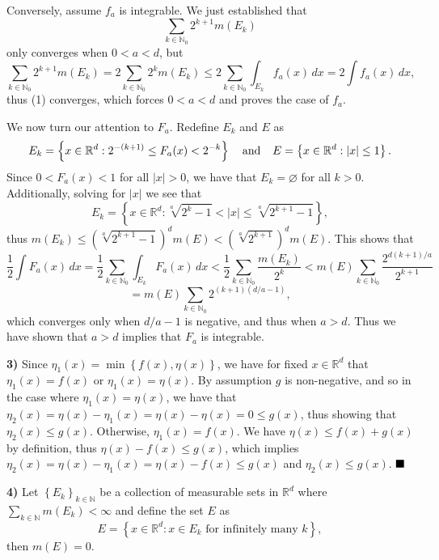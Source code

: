 \documentclass[12pt]{article}
\newcommand{\N}{\ensuremath{\mathbb{N}}}
\newcommand{\R}{\ensuremath{\mathbb{R}}}
\newcommand{\braceb}[1]{\left\{#1\right\}}
\newcommand{\vertb}[1]{\left\vert#1\right\vert}
\newcommand{\done}{\ensuremath{\strut\hfill\blacksquare}}
\renewcommand{\t}[1]{\text{ #1 }}
\newcommand{\sectionskip}{\vspace{0.15in}}
\begin{document}
Conversely, assume \( f_a \) is integrable.
We just established that
\begin{equation}
	\sum_{k \in \N_0} 2^{k + 1}m(E_k)
\end{equation}
only converges when \( 0 < a < d \), but
\[
	\sum_{k \in \N_0} 2^{k + 1}m(E_k)
	= 2\sum_{k \in \N_0} 2^{k}m(E_k)
	\leq 2\sum_{k \in \N_0} \int_{E_k} f_a(x) \, dx
	= 2\int f_a(x) \, dx,
\]
thus (1) converges, which forces \( 0 < a < d \) and proves the case of
\( f_a \).

We now turn our attention to \( F_a \).
Redefine \( E_k \) and \( E \) as
\[
	E_k = \braceb{x \in \R^d : 2^{-(k + 1)} \leq F_a(x) < 2^{-k}}
	\hspace{0.1in}
	\t{and}
	\hspace{0.1in}
	E = \braceb{x \in \R^d : \vertb{x} \leq 1}.
\]
Since \( 0 < F_a(x) < 1 \) for all \( \vertb{x} > 0 \), we have that
\( E_k = \varnothing \) for all \( k > 0 \).
Additionally, solving for \( \vertb{x} \) we see that
\[
	E_k = \braceb{
		x \in \R^d
		: \sqrt[a]{2^k - 1}
		< \vertb{x}
		\leq \sqrt[a]{2^{k + 1} - 1}
	},
\]
thus
\(
m(E_k)
\leq (\sqrt[a]{2^{k + 1} - 1})^dm(E)
< (\sqrt[a]{2^{k + 1}})^dm(E) \).
This shows that
\[
	\frac{1}{2} \int F_a(x) \, dx
	= \frac{1}{2} \sum_{k \in \N_0} \int_{E_k} F_a(x) \, dx
	< \frac{1}{2} \sum_{k \in \N_0} \frac{m(E_k)}{2^k}
	< m(E)\sum_{k \in \N_0} \frac{2^{d(k + 1)/a}}{2^{k + 1}}
\]
\[
	= m(E)\sum_{k \in \N_0} 2^{(k + 1)(d/a - 1)},
\]
which converges only when \( d/a - 1 \) is negative, and thus when
\( a > d \).
Thus we have shown that \( a > d \) implies that \( F_a \) is integrable.

\pagebreak
\textbf{3)}
Since \( \eta_1(x) = \min\braceb{f(x), \eta(x)} \), we have for fixed
\( x \in \R^d \) that \( \eta_1(x) = f(x) \) or \( \eta_1(x) = \eta(x) \).
By assumption \( g \) is non-negative, and so in the case where
\( \eta_1(x) = \eta(x) \), we have that
\( \eta_2(x) = \eta(x) - \eta_1(x) = \eta(x) - \eta(x) = 0 \leq g(x) \), thus
showing that \( \eta_2(x) \leq g(x) \).
Otherwise, \( \eta_1(x) = f(x) \).
We have \( \eta(x) \leq f(x) + g(x) \) by definition, thus
\( \eta(x) - f(x) \leq g(x) \), which implies
\( \eta_2(x) = \eta(x) - \eta_1(x) = \eta(x) - f(x) \leq g(x) \) and
\( \eta_2(x) \leq g(x) \).
\done

\sectionskip

\textbf{4)}
Let \( \braceb{E_k}_{k \in \N} \) be a collection of measurable sets in
\( \R^d \) where \( \sum_{k \in \N} m(E_k) < \infty \) and define the set
\( E \) as
\[
	E
	= \braceb{x \in \R^d : x \in E_k \t{for infinitely many} k},
\]
then \( m(E) = 0 \).
\end{document}

